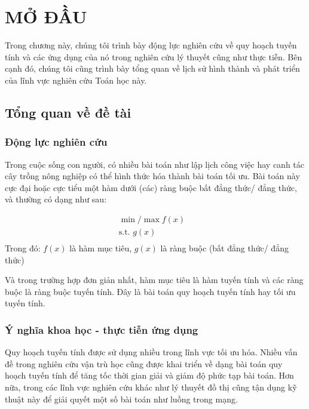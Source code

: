 \chapter{MỞ ĐẦU}

Trong chương này, chúng tôi trình bày động lực nghiên cứu về quy hoạch tuyến tính và các ứng dụng của nó trong nghiên cứu lý thuyết cũng như thực tiễn. Bên cạnh đó, chúng tôi cũng trình bày tổng quan về lịch sử hình thành và phát triển của lĩnh vực nghiên cứu Toán học này.

\section{Tổng quan về đề tài}

\subsection{Động lực nghiên cứu}

Trong cuộc sống con người, có nhiều bài toán như lập lịch công việc hay canh tác cây trồng nông nghiệp có thể hình thức hóa thành bài toán tối ưu. Bài toán này cực đại hoặc cực tiểu một hàm dưới (các) ràng buộc bất đẳng thức/ đẳng thức, và thường có dạng như sau:

\begin{equation}
    \begin{aligned}
    \min / \max f(x) \\ 
    \text{s.t. } g(x) & \\
    \end{aligned}
\end{equation}
Trong đó: $f(x)$ là hàm mục tiêu, $g(x)$ là ràng buộc (bất đẳng thức/ đẳng thức)

Và trong trường hợp đơn giản nhất, hàm mục tiêu là hàm tuyến tính và các ràng buộc là ràng buộc tuyến tính. Đây là bài toán quy hoạch tuyến tính hay tối ưu tuyến tính.

\subsection{Ý nghĩa khoa học - thực tiễn ứng dụng}

Quy hoạch tuyến tính được sử dụng nhiều trong lĩnh vực tối ưu hóa. Nhiều vấn đề trong nghiên cứu vận trù học cũng được khai triển về dạng bài toán quy hoạch tuyến tính để tăng tốc thời gian giải và giảm độ phức tạp bài toán. Hơn nữa, trong các lĩnh vực nghiên cứu khác như lý thuyết đồ thị cũng tận dụng kỹ thuật này để giải quyết một số bài toán như luồng trong mạng.

